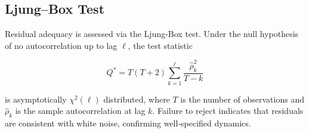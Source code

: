 \subsection{Ljung--Box Test}
Residual adequacy is assessed via the Ljung-Box test. Under the null hypothesis of no autocorrelation up to lag $\ell$, the test 
statistic

\vspace{-0.5cm}
\begin{equation}
    Q^{*} = T(T+2)\sum_{k=1}^{\ell}\frac{\hat{\rho}_k^2}{T-k}
\end{equation}

is asymptotically $\chi^2(\ell)$ distributed, where $T$ is the number of observations and $\hat{\rho}_k$ is the sample autocorrelation at lag $k$. Failure to reject indicates that residuals are consistent with white noise, confirming well-specified dynamics.